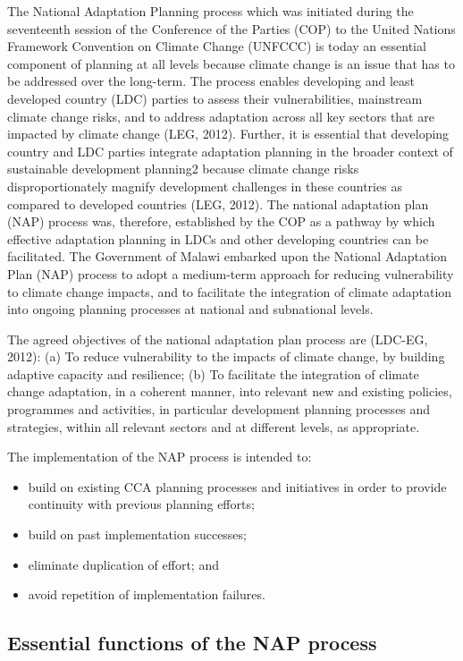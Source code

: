 \documentclass[
]{book}
\begin{document}
The National Adaptation Planning process which was initiated during the seventeenth session of the Conference of the Parties (COP) to the United Nations Framework
Convention on Climate Change (UNFCCC) is today an essential component of planning at all levels because climate change is an issue that has to be addressed over the
long-term. The process enables developing and least developed country (LDC) parties to assess their vulnerabilities, mainstream climate change risks, and to address
adaptation across all key sectors that are impacted by climate change (LEG, 2012). Further, it is essential that developing country and LDC parties integrate
adaptation planning in the broader context of sustainable development planning2 because climate change risks disproportionately magnify development challenges in
these countries as compared to developed countries (LEG, 2012). The national adaptation plan (NAP) process was, therefore, established by the COP as a pathway by
which effective adaptation planning in LDCs and other developing countries can be facilitated. The Government of Malawi embarked upon the National Adaptation Plan
(NAP) process to adopt a medium-term approach for reducing vulnerability to climate change impacts, and to facilitate the integration of climate adaptation into
ongoing planning processes at national and subnational levels.

The agreed objectives of the national adaptation plan process are (LDC-EG, 2012): (a) To reduce vulnerability to the impacts of climate change, by building adaptive
capacity and resilience; (b) To facilitate the integration of climate change adaptation, in a coherent manner, into relevant new and existing policies, programmes
and activities, in particular development planning processes and strategies, within all relevant sectors and at different levels, as appropriate.

The implementation of the NAP process is intended to:

\begin{itemize}
\item
  build on existing CCA planning processes and initiatives in order to provide continuity with previous planning efforts;
\item
  build on past implementation successes;
\item
  eliminate duplication of effort; and
\item
  avoid repetition of implementation failures.
\end{itemize}

\hypertarget{essential-functions-of-the-nap-process}{%
\subsection{Essential functions of the NAP process}\label{essential-functions-of-the-nap-process}}
\end{document}
